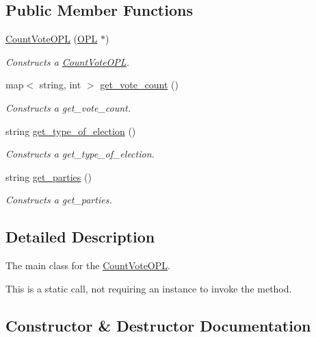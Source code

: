 \subsection*{Public Member Functions}
\begin{DoxyCompactItemize}
\item 
\hyperlink{classCountVoteOPL_ab82843609ce685e1020ab0259af08ad2}{Count\+Vote\+O\+PL} (\hyperlink{classOPL}{O\+PL} $\ast$)
\begin{DoxyCompactList}\small\item\em Constructs a \hyperlink{classCountVoteOPL}{Count\+Vote\+O\+PL}. \end{DoxyCompactList}\item 
map$<$ string, int $>$ \hyperlink{classCountVoteOPL_ad1cafea7b12271681434d5469afaff12}{get\+\_\+vote\+\_\+count} ()
\begin{DoxyCompactList}\small\item\em Constructs a get\+\_\+vote\+\_\+count. \end{DoxyCompactList}\item 
string \hyperlink{classCountVoteOPL_a1c8cfe1e91d5b937d4ae155445528e99}{get\+\_\+type\+\_\+of\+\_\+election} ()
\begin{DoxyCompactList}\small\item\em Constructs a get\+\_\+type\+\_\+of\+\_\+election. \end{DoxyCompactList}\item 
string \hyperlink{classCountVoteOPL_a8ac17200490e9b34085be35acffa4d63}{get\+\_\+parties} ()
\begin{DoxyCompactList}\small\item\em Constructs a get\+\_\+parties. \end{DoxyCompactList}\end{DoxyCompactItemize}


\subsection{Detailed Description}
The main class for the \hyperlink{classCountVoteOPL}{Count\+Vote\+O\+PL}. 

This is a static call, not requiring an instance to invoke the method. 

\subsection{Constructor \& Destructor Documentation}
\mbox{\label{classCountVoteOPL_ab82843609ce685e1020ab0259af08ad2}} 
